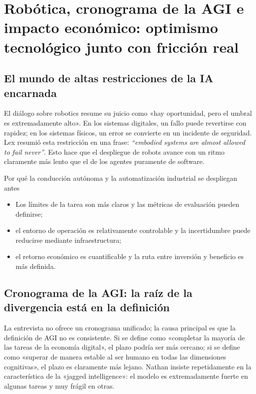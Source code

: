 \section{Robótica, cronograma de la AGI e impacto económico: optimismo tecnológico junto con fricción real}

\subsection{El mundo de altas restricciones de la IA encarnada}

El diálogo sobre robotics resume su juicio como «hay oportunidad, pero el umbral es extremadamente alto». En los sistemas digitales, un fallo puede revertirse con rapidez; en los sistemas físicos, un error se convierte en un incidente de seguridad. Lex resumió esta restricción en una frase: \textit{``embodied systems are almost allowed to fail never''}. Esto hace que el despliegue de robots avance con un ritmo claramente más lento que el de los agentes puramente de software.

\begin{importantbox}{Por qué la conducción autónoma y la automatización industrial se despliegan antes}
\begin{itemize}[leftmargin=1.5em]
    \item Los límites de la tarea son más claros y las métricas de evaluación pueden definirse;
    \item el entorno de operación es relativamente controlable y la incertidumbre puede reducirse mediante infraestructura;
    \item el retorno económico es cuantificable y la ruta entre inversión y beneficio es más definida.
\end{itemize}
\end{importantbox}

\subsection{Cronograma de la AGI: la raíz de la divergencia está en la definición}

La entrevista no ofrece un cronograma unificado; la causa principal es que la definición de AGI no es consistente. Si se define como «completar la mayoría de las tareas de la economía digital», el plazo podría ser más cercano; si se define como «superar de manera estable al ser humano en todas las dimensiones cognitivas», el plazo es claramente más lejano. Nathan insiste repetidamente en la característica de la «jagged intelligence»: el modelo es extremadamente fuerte en algunas tareas y muy frágil en otras.

